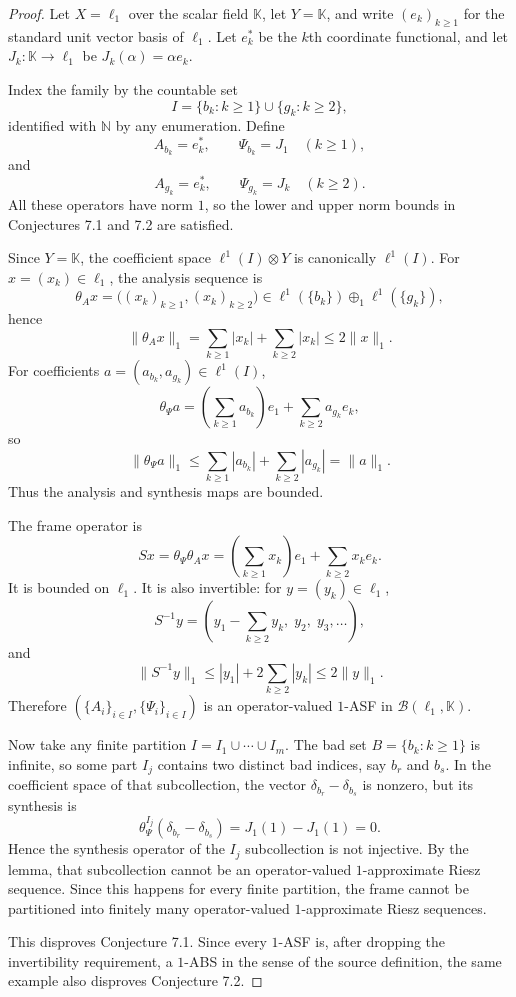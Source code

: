 \documentclass[11pt]{article}
\begin{document}
\begin{proof}
Let $X=\ell_1$ over the scalar field $\mathbb K$, let $Y=\mathbb K$, and write
$(e_k)_{k\geq1}$ for the standard unit vector basis of $\ell_1$.  Let
$e_k^*$ be the $k$th coordinate functional, and let
$J_k:\mathbb K\to\ell_1$ be $J_k(\alpha)=\alpha e_k$.

Index the family by the countable set
\[
I=\{b_k:k\geq 1\}\cup\{g_k:k\geq 2\},
\]
identified with $\mathbb N$ by any enumeration.  Define
\[
A_{b_k}=e_k^*,\qquad \Psi_{b_k}=J_1\quad(k\geq1),
\]
and
\[
A_{g_k}=e_k^*,\qquad \Psi_{g_k}=J_k\quad(k\geq2).
\]
All these operators have norm $1$, so the lower and upper norm bounds in
Conjectures 7.1 and 7.2 are satisfied.

Since $Y=\mathbb K$, the coefficient space
$\ell^1(I)\otimes Y$ is canonically $\ell^1(I)$.  For $x=(x_k)\in\ell_1$,
the analysis sequence is
\[
\theta_Ax=\big((x_k)_{k\geq1},(x_k)_{k\geq2}\big)\in
\ell^1(\{b_k\})\oplus_1\ell^1(\{g_k\}),
\]
hence
\[
\|\theta_Ax\|_1=\sum_{k\geq1}|x_k|+\sum_{k\geq2}|x_k|\leq 2\|x\|_1.
\]
For coefficients $a=(a_{b_k},a_{g_k})\in\ell^1(I)$,
\[
\theta_\Psi a=\left(\sum_{k\geq1}a_{b_k}\right)e_1+
 \sum_{k\geq2}a_{g_k}e_k,
\]
so
\[
\|\theta_\Psi a\|_1
\leq \sum_{k\geq1}|a_{b_k}|+\sum_{k\geq2}|a_{g_k}|=\|a\|_1.
\]
Thus the analysis and synthesis maps are bounded.

The frame operator is
\[
Sx=\theta_\Psi\theta_Ax
 =\left(\sum_{k\geq1}x_k\right)e_1+\sum_{k\geq2}x_ke_k.
\]
It is bounded on $\ell_1$.  It is also invertible: for
$y=(y_k)\in\ell_1$,
\[
S^{-1}y=\left(y_1-\sum_{k\geq2}y_k,\; y_2,\; y_3,\ldots\right),
\]
and
\[
\|S^{-1}y\|_1
\leq |y_1|+2\sum_{k\geq2}|y_k|
\leq 2\|y\|_1.
\]
Therefore $(\{A_i\}_{i\in I},\{\Psi_i\}_{i\in I})$ is an operator-valued
$1$-ASF in $\mathcal B(\ell_1,\mathbb K)$.

Now take any finite partition $I=I_1\cup\cdots\cup I_m$.  The bad set
$B=\{b_k:k\geq1\}$ is infinite, so some part $I_j$ contains two distinct bad
indices, say $b_r$ and $b_s$.  In the coefficient space of that subcollection,
the vector $\delta_{b_r}-\delta_{b_s}$ is nonzero, but its synthesis is
\[
\theta_\Psi^{I_j}(\delta_{b_r}-\delta_{b_s})
  =J_1(1)-J_1(1)=0.
\]
Hence the synthesis operator of the $I_j$ subcollection is not injective.  By
the lemma, that subcollection cannot be an operator-valued $1$-approximate
Riesz sequence.  Since this happens for every finite partition, the frame
cannot be partitioned into finitely many operator-valued $1$-approximate Riesz
sequences.

This disproves Conjecture 7.1.  Since every $1$-ASF is, after dropping the
invertibility requirement, a $1$-ABS in the sense of the source definition, the
same example also disproves Conjecture 7.2.
\end{proof}
\end{document}
